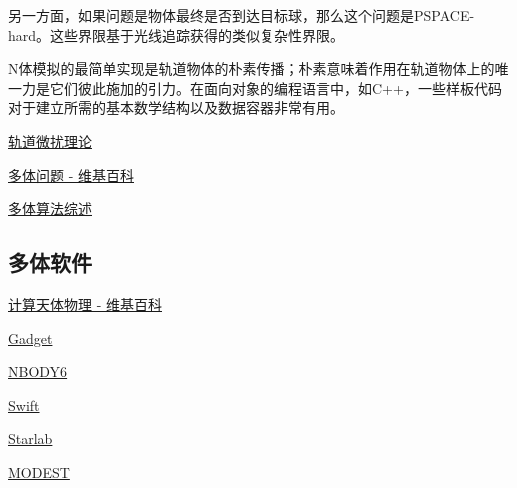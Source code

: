 另一方面，如果问题是物体最终是否到达目标球，那么这个问题是PSPACE-hard。这些界限基于光线追踪获得的类似复杂性界限。

N体模拟的最简单实现是轨道物体的朴素传播；朴素意味着作用在轨道物体上的唯一力是它们彼此施加的引力。在面向对象的编程语言中，如C++，一些样板代码对于建立所需的基本数学结构以及数据容器非常有用。








\href{https://en.wikipedia.org/wiki/Orbit_modeling}{轨道微扰理论}

\href{https://en.wikipedia.org/wiki/N-body_problem}{多体问题 - 维基百科}

\href{https://arxiv.org/abs/0806.3950v1}{多体算法综述}

\subsection{多体软件}

\href{https://en.wikipedia.org/wiki/Computational_astrophysics}{计算天体物理 - 维基百科}

\href{https://wwwmpa.mpa-garching.mpg.de/gadget/}{Gadget}

\href{https://people.ast.cam.ac.uk/~sverre/web/pages/nbody.htm}{NBODY6}

\href{https://www.boulder.swri.edu/~hal/swift.html}{Swift}

\href{https://www.sns.ias.edu/~starlab/}{Starlab}

\href{http://www.manybody.org/modest/}{MODEST}
